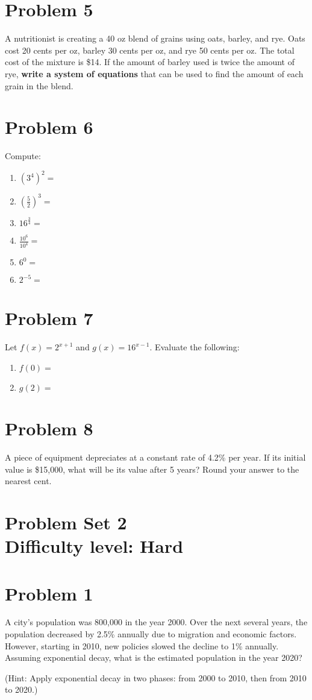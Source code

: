 \documentclass[12pt]{article}
\begin{document}
\section*{Problem 5}
A nutritionist is creating a 40 oz blend of grains using oats, barley, and rye. Oats cost 20 cents per oz, barley 30 cents per oz, and rye 50 cents per oz. The total cost of the mixture is \$14. If the amount of barley used is twice the amount of rye, \textbf{write a system of equations} that can be used to find the amount of each grain in the blend.

\section*{Problem 6}
Compute:
\begin{enumerate}[label=(\alph*)]
    \item \( \left(3^4\right)^2 = \)
    \item \( \left(\frac{5}{2}\right)^3 = \)
    \item \( 16^{\frac{3}{4}} = \)
    \item \( \frac{10^6}{10^4} = \)
    \item \( 6^0 = \)
    \item \( 2^{-5} = \)
\end{enumerate}

\section*{Problem 7}
Let \( f(x) = 2^{x+1} \) and \( g(x) = 16^{x-1} \). Evaluate the following:
\begin{enumerate}[label=(\alph*)]
    \item \( f(0) = \)
    \item \( g(2) = \)
\end{enumerate}

\section*{Problem 8}
A piece of equipment depreciates at a constant rate of 4.2\% per year. If its initial value is \$15{,}000, what will be its value after 5 years? Round your answer to the nearest cent.

\section*{Problem Set 2\\Difficulty level: Hard}
\section*{Problem 1}
A city's population was 800,000 in the year 2000. Over the next several years, the population decreased by 2.5\% annually due to migration and economic factors. However, starting in 2010, new policies slowed the decline to 1\% annually. Assuming exponential decay, what is the estimated population in the year 2020?

(Hint: Apply exponential decay in two phases: from 2000 to 2010, then from 2010 to 2020.)
\end{document}
